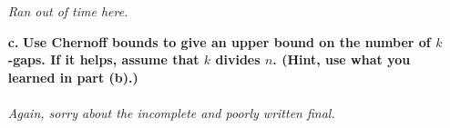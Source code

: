 \documentclass{article}
\begin{document}
\begin{enumerate}
\emph{Ran out of time here.}

\item[\textbf{c.}] \textbf{Use Chernoff bounds to give an upper bound on the 
number of $k$-gaps. If it helps, assume that $k$ divides $n$. (Hint, use what 
you learned in part (b).)}\\\\

\emph{Again, sorry about the incomplete and poorly written final.}

\end{enumerate}
\end{document}
